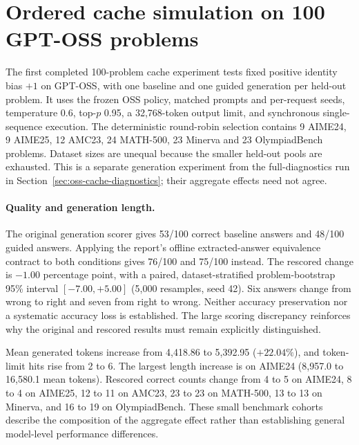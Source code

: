 \section{Ordered cache simulation on 100 GPT-OSS problems}
\label{sec:oss-cache-100}

The first completed 100-problem cache experiment tests fixed positive
identity bias $+1$ on GPT-OSS, with one baseline and one guided generation
per held-out problem. It uses the frozen OSS policy, matched prompts and
per-request seeds, temperature 0.6, top-$p$ 0.95, a 32,768-token output
limit, and synchronous single-sequence execution. The deterministic
round-robin selection contains 9 AIME24, 9 AIME25, 12 AMC23, 24 MATH-500,
23 Minerva and 23 OlympiadBench problems. Dataset sizes are unequal because
the smaller held-out pools are exhausted. This is a separate generation
experiment from the full-diagnostics run in
Section~\ref{sec:oss-cache-diagnostics}; their aggregate effects need not agree.

\paragraph{Quality and generation length.}
The original generation scorer gives 53/100 correct baseline answers and
48/100 guided answers. Applying the report's offline extracted-answer
equivalence contract to both conditions gives 76/100 and 75/100 instead.
The rescored change is $-1.00$ percentage point, with a paired,
dataset-stratified problem-bootstrap 95\% interval $[-7.00,+5.00]$
(5,000 resamples, seed 42). Six answers change from wrong to right and
seven from right to wrong. Neither accuracy preservation nor a systematic
accuracy loss is established. The large scoring discrepancy reinforces
why the original and rescored results must remain explicitly distinguished.

Mean generated tokens increase from 4,418.86 to 5,392.95 ($+22.04\%$), and
token-limit hits rise from 2 to 6. The largest length increase is on AIME24
(8,957.0 to 16,580.1 mean tokens). Rescored correct counts change from 4 to 5
on AIME24, 8 to 4 on AIME25, 12 to 11 on AMC23, 23 to 23 on MATH-500,
13 to 13 on Minerva, and 16 to 19 on OlympiadBench. These small
benchmark cohorts describe the composition of the aggregate effect rather
than establishing general model-level performance differences.

